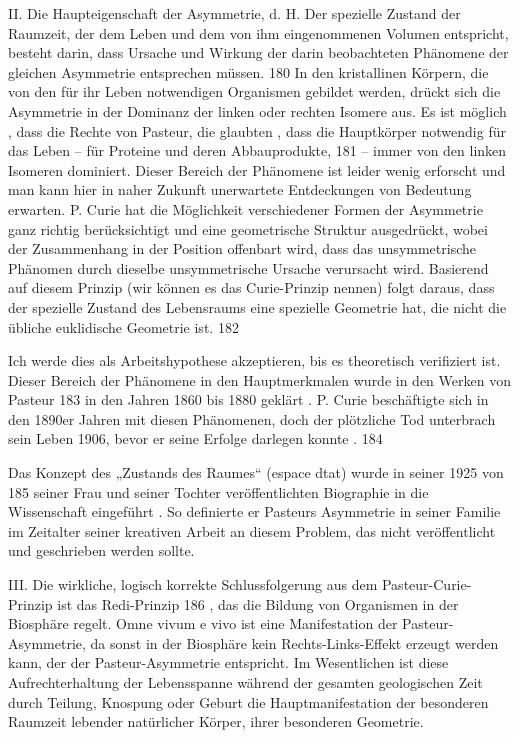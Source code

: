 \documentclass[11pt,a4paper]{book}
\begin{document}
II. Die Haupteigenschaft der Asymmetrie, d. H. Der spezielle Zustand der Raumzeit, der dem Leben und dem von ihm eingenommenen Volumen entspricht, besteht darin, dass Ursache und Wirkung der darin beobachteten Phänomene der gleichen Asymmetrie entsprechen müssen. 180 In den kristallinen Körpern, die von den für ihr Leben notwendigen Organismen gebildet werden, drückt sich die Asymmetrie in der Dominanz der linken oder rechten Isomere aus. Es ist möglich , dass die Rechte von Pasteur, die glaubten , dass die Hauptkörper notwendig für das Leben -- für Proteine und deren Abbauprodukte, 181 -- immer von den linken Isomeren dominiert. Dieser Bereich der Phänomene ist leider wenig erforscht und man kann hier in naher Zukunft unerwartete Entdeckungen von Bedeutung erwarten. P. Curie hat die Möglichkeit verschiedener Formen der Asymmetrie ganz richtig berücksichtigt und eine geometrische Struktur ausgedrückt, wobei der Zusammenhang in der Position offenbart wird, dass das unsymmetrische Phänomen durch dieselbe unsymmetrische Ursache verursacht wird. Basierend auf diesem Prinzip (wir können es das Curie-Prinzip nennen) folgt daraus, dass der spezielle Zustand des Lebensraums eine spezielle Geometrie hat, die nicht die übliche euklidische Geometrie ist. 182



Ich werde dies als Arbeitshypothese akzeptieren, bis es theoretisch verifiziert ist. Dieser Bereich der Phänomene in den Hauptmerkmalen wurde in den Werken von Pasteur 183 in den Jahren 1860 bis 1880 geklärt . P. Curie beschäftigte sich in den 1890er Jahren mit diesen Phänomenen, doch der plötzliche Tod unterbrach sein Leben 1906, bevor er seine Erfolge darlegen konnte . 184



Das Konzept des „Zustands des Raumes“ (espace dtat) wurde in seiner 1925 von 185 seiner Frau und seiner Tochter veröffentlichten Biographie in die Wissenschaft eingeführt . So definierte er Pasteurs Asymmetrie in seiner Familie im Zeitalter seiner kreativen Arbeit an diesem Problem, das nicht veröffentlicht und geschrieben werden sollte.



III. Die wirkliche, logisch korrekte Schlussfolgerung aus dem Pasteur-Curie-Prinzip ist das Redi-Prinzip 186 , das die Bildung von Organismen in der Biosphäre regelt. Omne vivum e vivo ist eine Manifestation der Pasteur-Asymmetrie, da sonst in der Biosphäre kein Rechts-Links-Effekt erzeugt werden kann, der der Pasteur-Asymmetrie entspricht. Im Wesentlichen ist diese Aufrechterhaltung der Lebensspanne während der gesamten geologischen Zeit durch Teilung, Knospung oder Geburt die Hauptmanifestation der besonderen Raumzeit lebender natürlicher Körper, ihrer besonderen Geometrie.
\end{document}
